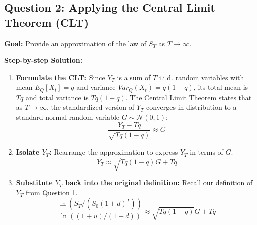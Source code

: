 \subsection*{Question 2: Applying the Central Limit Theorem (CLT)}
\textbf{Goal:} Provide an approximation of the law of $S_T$ as $T \to \infty$.

\vspace{0.5cm}
\noindent \textbf{Step-by-step Solution:}
\begin{enumerate}
    \item \textbf{Formulate the CLT:} Since $Y_T$ is a sum of $T$ i.i.d. random variables with mean $E_Q[X_t] = q$ and variance $Var_Q(X_t) = q(1-q)$, its total mean is $Tq$ and total variance is $Tq(1-q)$. 
    The Central Limit Theorem states that as $T \to \infty$, the standardized version of $Y_T$ converges in distribution to a standard normal random variable $G \sim \mathcal{N}(0,1)$:
    \begin{equation*}
        \frac{Y_T - Tq}{\sqrt{Tq(1-q)}} \approx G
    \end{equation*}
    
    \item \textbf{Isolate $Y_T$:} Rearrange the approximation to express $Y_T$ in terms of $G$.
    \begin{equation*}
        Y_T \approx \sqrt{Tq(1-q)}G + Tq
    \end{equation*}
    
    \item \textbf{Substitute $Y_T$ back into the original definition:} Recall our definition of $Y_T$ from Question 1.
    \begin{equation*}
        \frac{\ln(S_T / (S_0(1+d)^T))}{\ln((1+u)/(1+d))} \approx \sqrt{Tq(1-q)}G + Tq
    \end{equation*}
    

\end{enumerate}
